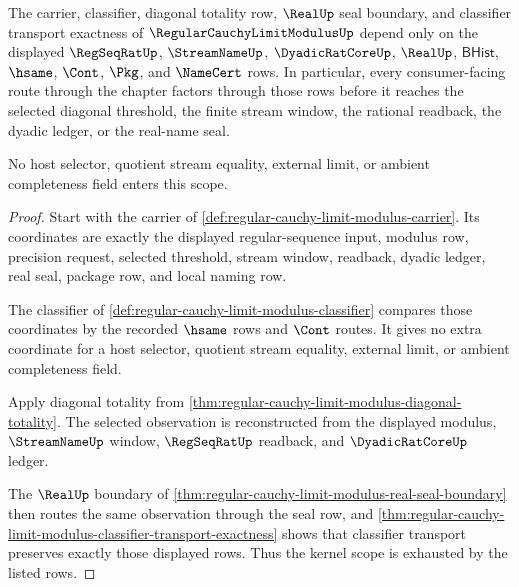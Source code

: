 \begin{theorem}
\label{thm:regular-cauchy-limit-modulus-scoped-kernel-binding}
The carrier, classifier, diagonal totality row, $\RealUp$ seal boundary, and classifier transport exactness of $\RegularCauchyLimitModulusUp$ depend only on the displayed $\RegSeqRatUp$, $\StreamNameUp$, $\DyadicRatCoreUp$, $\RealUp$, $\mathsf{BHist}$, $\hsame$, $\Cont$, $\Pkg$, and $\NameCert$ rows. In particular, every consumer-facing route through the chapter factors through those rows before it reaches the selected diagonal threshold, the finite stream window, the rational readback, the dyadic ledger, or the real-name seal.

No host selector, quotient stream equality, external limit, or ambient completeness field enters this scope.
\end{theorem}
\begin{proof}
Start with the carrier of \autoref{def:regular-cauchy-limit-modulus-carrier}. Its coordinates are exactly the displayed regular-sequence input, modulus row, precision request, selected threshold, stream window, readback, dyadic ledger, real seal, package row, and local naming row.

The classifier of \autoref{def:regular-cauchy-limit-modulus-classifier} compares those coordinates by the recorded $\hsame$ rows and $\Cont$ routes. It gives no extra coordinate for a host selector, quotient stream equality, external limit, or ambient completeness field.

Apply diagonal totality from \autoref{thm:regular-cauchy-limit-modulus-diagonal-totality}. The selected observation is reconstructed from the displayed modulus, $\StreamNameUp$ window, $\RegSeqRatUp$ readback, and $\DyadicRatCoreUp$ ledger.

The $\RealUp$ boundary of \autoref{thm:regular-cauchy-limit-modulus-real-seal-boundary} then routes the same observation through the seal row, and \autoref{thm:regular-cauchy-limit-modulus-classifier-transport-exactness} shows that classifier transport preserves exactly those displayed rows. Thus the kernel scope is exhausted by the listed rows.
\end{proof}

